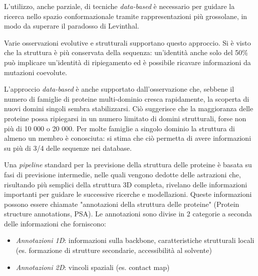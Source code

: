 {\par L'utilizzo, anche parziale, di tecniche \textit{data-based} è necessario per guidare la ricerca nello spazio conformazionale tramite rappresentazioni più grossolane, in modo da superare il paradosso di Levinthal.

\par Varie osservazioni evolutive e strutturali supportano questo approccio. Si è visto che la struttura è più conservata della sequenza: un'identità anche solo del 50\% può implicare un'identità di ripiegamento ed è possibile ricavare informazioni da mutazioni coevolute.

\par L'approccio \textit{data-based} è anche supportato dall'osservazione che, sebbene il numero di famiglie di proteine multi-dominio cresca rapidamente, la scoperta di nuovi domini singoli sembra stabilizzarsi. Ciò suggerisce che la maggioranza delle proteine possa ripiegarsi in un numero limitato di domini strutturali, forse non più di 10 000 o 20 000. Per molte famiglie a singolo dominio la struttura di almeno un membro è conosciuta: si stima che ciò permetta di avere informazioni su più di 3/4 delle sequenze nei database\supercite{alberts2018essential}. \\

\par Una \textit{pipeline} standard per la previsione della struttura delle proteine è basata su fasi di previsione intermedie, nelle quali vengono dedotte delle astrazioni che, risultando più semplici della struttura 3D completa, rivelano delle informazioni importanti per guidare le successive ricerche e modellazioni. Queste informazioni possono essere chiamate "annotazioni della struttura delle proteine" (Protein structure annotations, PSA). Le annotazioni sono divise in 2 categorie a seconda delle informazioni che forniscono:
\begin{itemize}
	\item \textit{Annotazioni 1D}: informazioni sulla backbone, caratteristiche strutturali locali (es. formazione di strutture secondarie, accessibilità al solvente)
	\item \textit{Annotazioni 2D}: vincoli spaziali (es. contact map)
\end{itemize}

}
